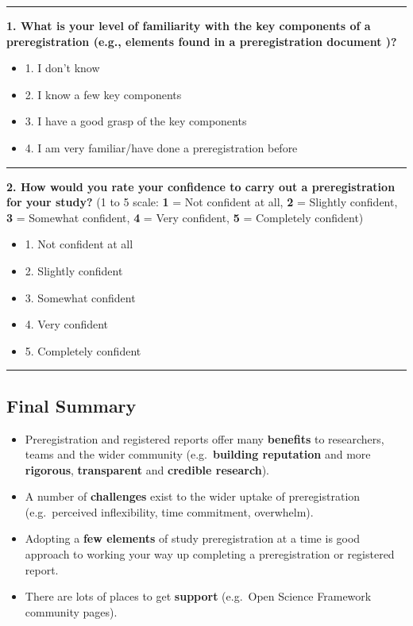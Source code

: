 \documentclass[
  letterpaper,
  DIV=11,
  numbers=noendperiod]{scrartcl}
\begin{document}
\begin{center}\rule{0.5\linewidth}{0.5pt}\end{center}

\textbf{1. What is your level of familiarity with the key components of
a preregistration (e.g., elements found in a preregistration document
)?}

\begin{itemize}
\item[$\square$]
  1. I don't know
\item[$\square$]
  2. I know a few key components
\item[$\square$]
  3. I have a good grasp of the key components
\item[$\square$]
  4. I am very familiar/have done a preregistration before
\end{itemize}

\begin{center}\rule{0.5\linewidth}{0.5pt}\end{center}

\textbf{2. How would you rate your confidence to carry out a
preregistration for your study?} (1 to 5 scale: \textbf{1} = Not
confident at all, \textbf{2} = Slightly confident, \textbf{3} = Somewhat
confident, \textbf{4} = Very confident, \textbf{5} = Completely
confident)

\begin{itemize}
\item[$\square$]
  1. Not confident at all
\item[$\square$]
  2. Slightly confident
\item[$\square$]
  3. Somewhat confident
\item[$\square$]
  4. Very confident
\item[$\square$]
  5. Completely confident
\end{itemize}

\begin{center}\rule{0.5\linewidth}{0.5pt}\end{center}

\subsection{Final Summary}\label{final-summary}

\begin{itemize}
\item
  Preregistration and registered reports offer many \textbf{benefits} to
  researchers, teams and the wider community (e.g.~\textbf{building
  reputation} and more \textbf{rigorous}, \textbf{transparent} and
  \textbf{credible research}).
\item
  A number of \textbf{challenges} exist to the wider uptake of
  preregistration (e.g.~perceived inflexibility, time commitment,
  overwhelm).
\item
  Adopting a \textbf{few elements} of study preregistration at a time is
  good approach to working your way up completing a preregistration or
  registered report.
\item
  There are lots of places to get \textbf{support} (e.g.~Open Science
  Framework community pages).
\end{itemize}
\end{document}
